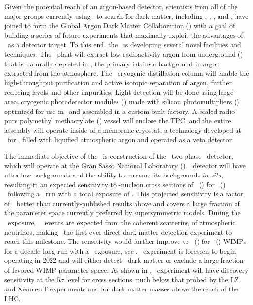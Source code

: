 Given the potential reach of an argon-based detector, scientists from all of the major groups currently using \LAr\ to search for dark matter, including \ArDM, \DSfs, \DEAP, and \mCLEAN, have joined to form the Global Argon Dark Matter Collaboration (\GADMC) with a goal of building a series of future experiments that maximally exploit the advantages of \LAr\ as a detector target. To this end, the \GADMC\ is developing several novel facilities and techniques. The \Urania\ plant will extract low-radioactivity argon from underground (\UAr) that is naturally depleted in , the primary intrinsic background in argon extracted from the atmosphere. The \Aria\ cryogenic distillation column will enable the high-throughput purification and active isotopic separation of argon, further reducing  levels and other impurities. Light detection will be done using large-area, cryogenic photodetector modules (\DSkPdms) made with silicon photomultipliers (\SiPMs) optimized for use in \LAr\ and assembled in a custom-built factory. A sealed radio-pure polymethyl methacrylate (\PMMA)  vessel will enclose the TPC, and the entire assembly will operate inside of a membrane cryostat, a technology developed at \CERN\ for \pDUNE, filled with liquified atmospheric argon and operated as a veto detector.

The immediate objective of the \GADMC\ is construction of the \DSks\ two-phase \LAr\ detector, which will operate at the Gran Sasso National Laboratory (\LNGS).  \DSks\ detector will have ultra-low backgrounds and the ability to measure its backgrounds {\it in situ}, resulting in an expected sensitivity to \WIMP-nucleon cross sections of \DSkSensitivityOneGeVUnit\ (\DSkSensitivityTenGeVUnit) for \WIMPMassOneTev\ (\WIMPMassTenTev) \WIMPs\  following a \DSkRunTimePlanned\ run with a total exposure of \DSkExposure.  This projected sensitivity is a factor of~\DSkSensitivityImprovementOneTeV\ better than currently-published results above \WIMPMassOneTev and covers a large fraction of the parameter space currently preferred by supersymmetric models.  During the \DSkExposure\ exposure, \DSkNuInducedBackgroundBare\ \NR\ events are expected from the coherent scattering of atmospheric neutrinos, making \DSks\ the first ever direct dark matter detection experiment to reach this milestone.  The sensitivity would further improve to \DSkExtendedSensitivityOneGeVUnit\ (\DSkExtendedSensitivityTenGeVUnit) for \WIMPMassOneTev\ (\WIMPMassTenTev) WIMPs for a decade-long run with a \DSkExtendedExposure\ exposure, see .  \DSks\ experiment is foreseen to begin operating in 2022 and will either detect \WIMP\ dark matter or exclude a large fraction of favored WIMP parameter space.  As shown in , \DSks\ experiment will have discovery sensitivity at the $5\sigma$ level for cross sections much below that probed by the LZ and Xenon-nT experiments and for dark matter masses above the reach of the LHC.

